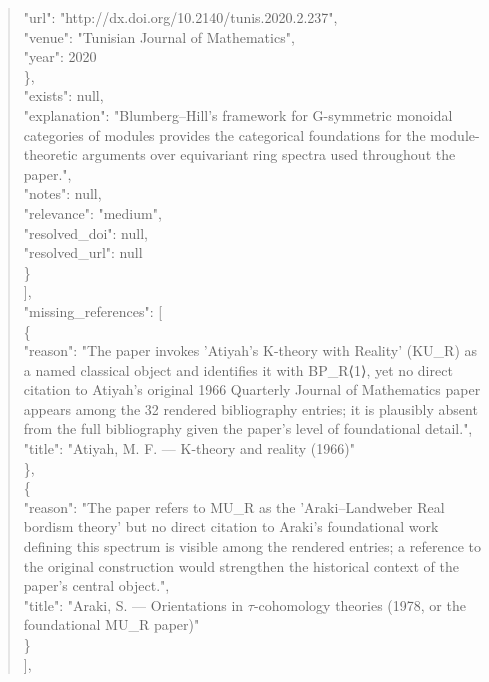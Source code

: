 \documentclass[11pt]{article}
\begin{document}
\begin{quote}
        "url": "http://dx.doi.org/10.2140/tunis.2020.2.237",\\
        "venue": "Tunisian Journal of Mathematics",\\
        "year": 2020\\
      \},\\
      "exists": null,\\
      "explanation": "Blumberg--Hill's framework for G-symmetric monoidal categories of modules provides the categorical foundations for the module-theoretic arguments over equivariant ring spectra used throughout the paper.",\\
      "notes": null,\\
      "relevance": "medium",\\
      "resolved\_doi": null,\\
      "resolved\_url": null\\
    \}\\
  ],\\
  "missing\_references": [\\
    \{\\
      "reason": "The paper invokes 'Atiyah's K-theory with Reality' (KU\_R) as a named classical object and identifies it with BP\_R⟨1⟩, yet no direct citation to Atiyah's original 1966 Quarterly Journal of Mathematics paper appears among the 32 rendered bibliography entries; it is plausibly absent from the full bibliography given the paper's level of foundational detail.",\\
      "title": "Atiyah, M. F. --- K-theory and reality (1966)"\\
    \},\\
    \{\\
      "reason": "The paper refers to MU\_R as the 'Araki--Landweber Real bordism theory' but no direct citation to Araki's foundational work defining this spectrum is visible among the rendered entries; a reference to the original construction would strengthen the historical context of the paper's central object.",\\
      "title": "Araki, S. --- Orientations in \ensuremath{\tau}-cohomology theories (1978, or the foundational MU\_R paper)"\\
    \}\\
  ],\\

\end{quote}
\end{document}
